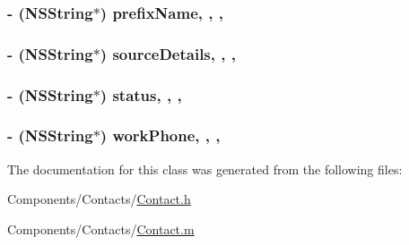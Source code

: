 \hypertarget{interface_contact_a5bc67629e5dc9b61ff097aeff0701076}{
\subsubsection[{prefix\-Name}]{\setlength{\rightskip}{0pt plus 5cm}-\/ (N\-S\-String$\ast$) prefix\-Name\hspace{0.3cm}{\ttfamily [read]}, {\ttfamily [write]}, {\ttfamily [nonatomic]}, {\ttfamily [strong]}}}\label{interface_contact_a5bc67629e5dc9b61ff097aeff0701076}
\hypertarget{interface_contact_a37a7c97391240a1586822a1c0dde5df3}{
\subsubsection[{source\-Details}]{\setlength{\rightskip}{0pt plus 5cm}-\/ (N\-S\-String$\ast$) source\-Details\hspace{0.3cm}{\ttfamily [read]}, {\ttfamily [write]}, {\ttfamily [nonatomic]}, {\ttfamily [strong]}}}\label{interface_contact_a37a7c97391240a1586822a1c0dde5df3}
\hypertarget{interface_contact_ab26ceb12a3c4b9e3e64b69e8d945a2dd}{
\subsubsection[{status}]{\setlength{\rightskip}{0pt plus 5cm}-\/ (N\-S\-String$\ast$) status\hspace{0.3cm}{\ttfamily [read]}, {\ttfamily [write]}, {\ttfamily [nonatomic]}, {\ttfamily [strong]}}}\label{interface_contact_ab26ceb12a3c4b9e3e64b69e8d945a2dd}
\hypertarget{interface_contact_a76be4721aa8c7eab59a9aad7a34d4986}{
\subsubsection[{work\-Phone}]{\setlength{\rightskip}{0pt plus 5cm}-\/ (N\-S\-String$\ast$) work\-Phone\hspace{0.3cm}{\ttfamily [read]}, {\ttfamily [write]}, {\ttfamily [nonatomic]}, {\ttfamily [strong]}}}\label{interface_contact_a76be4721aa8c7eab59a9aad7a34d4986}


The documentation for this class was generated from the following files\-:\begin{DoxyCompactItemize}
\item 
Components/\-Contacts/\hyperlink{_contact_8h}{Contact.\-h}\item 
Components/\-Contacts/\hyperlink{_contact_8m}{Contact.\-m}\end{DoxyCompactItemize}
